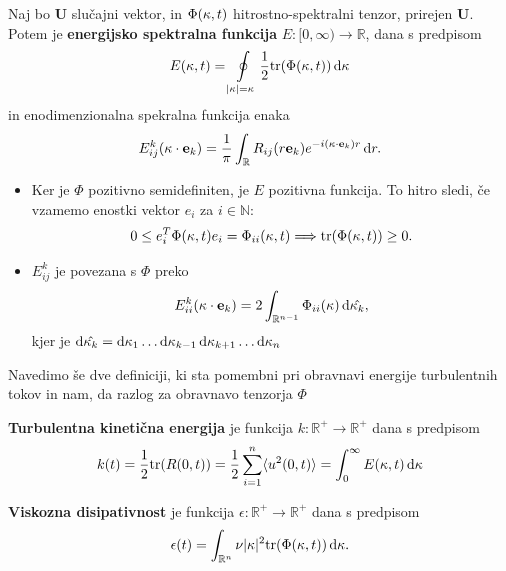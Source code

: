 \documentclass[mat2, tisk]{fmfdelo}
\newcommand{\R}{\mathbb R}
\newcommand{\N}{\mathbb N}
\newcommand{\bd}{\textbf}
\begin{document}
\begin{definicija}
Naj bo $\bd{U}$ slučajni vektor, in $\Phi(\text{\bd{$\kappa$}}, t)$ 
hitrostno-spektralni tenzor, prirejen $\bd{U}$. Potem je \bd{energijsko spektralna funkcija} $E: [0, \infty) \rightarrow \R$, dana
s predpisom
\begin{equation}
E(\kappa, t) = \oint\limits_{|\text{\bd{$\kappa$}}| = \kappa} \frac{1}{2} \text{tr}(\Phi(\text{\bd{$\kappa$}}, t)) \dif \text{\bd{$\kappa$}}
\end{equation}
in enodimenzionalna spekralna funkcija enaka 
\begin{equation}
E_{ij}^k (\bd{\text{$\kappa$}} \cdot \bd{e}_k) = \frac{1}{\pi} \int_\R R_{ij}(r\bd{e}_k) e^{-i(\bd{\text{$\kappa$}} \cdot \bd{e}_k)r} \dif r.
\end{equation}
\end{definicija}

\begin{opomba}
  \hfill
\begin{itemize}
\item Ker je $\Phi$ pozitivno semidefiniten, je $E$ pozitivna funkcija. To hitro sledi, če vzamemo 
enostki vektor $e_i$ za $i\in \N$:
$$
0 \leq e^T_i \Phi(\text{\bd{$\kappa$}}, t) e_i = \Phi_{ii}(\text{\bd{$\kappa$}}, t) \Longrightarrow \text{tr}(\Phi(\text{\bd{$\kappa$}}, t)) \geq 0.
$$
\item $E_{ij}^k$ je povezana s $\Phi$ preko 
$$
E^k_{ii}(\bd{\text{$\kappa$}} \cdot \bd{e}_k) = 2 \int_{\R^{n-1}} \Phi_{ii}(\bd{\text{$\kappa$}}) \dif \hat{\bd{\text{$\kappa$}}_k},
$$
kjer je $ \dif \hat{\bd{\text{$\kappa$}}_k} = \dif \kappa_1 \dots \dif \kappa_{k-1} \dif \kappa_{k+1} \dots \dif \kappa_{n}$
\end{itemize}
\end{opomba}

Navedimo še dve definiciji, ki sta pomembni pri obravnavi energije 
turbulentnih tokov in nam, da razlog za obravnavo tenzorja $\Phi$

\begin{definicija}
\textbf{Turbulentna kinetična energija} je funkcija $k:\R^+ \rightarrow \R^+$ dana s predpisom
\begin{equation}
k(t) = \frac{1}{2} \text{tr}(R(0, t)) = \frac{1}{2} \sum_{i=1}^{n} \langle u^2(0, t) \rangle = \int_{0}^\infty E(\kappa, t) \dif \bd{\text{$\kappa$}}
\end{equation}
\end{definicija}

\begin{definicija}
\bd{Viskozna disipativnost} je funkcija $\epsilon: \R^+ \rightarrow \R^+$ dana s predpisom
\begin{equation}
\epsilon(t) = \int_{\R^n} \nu |\bd{\text{$\kappa$}}|^2 \text{tr}(\Phi(\bd{\text{$\kappa$}}, t)) \dif \bd{\text{$\kappa$}}.
\end{equation}
\end{definicija}
\end{document}

